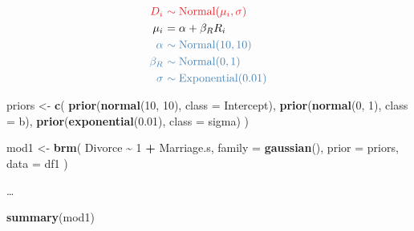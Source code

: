\documentclass[
  a4paper,11pt,twoside,onecolumn,openright,final,oldfontcommands]{memoir}
\newenvironment{Shaded}{\begin{snugshade}}{\end{snugshade}}
\newcommand{\DataTypeTok}[1]{\textcolor[rgb]{0.13,0.29,0.53}{#1}}
\newcommand{\DecValTok}[1]{\textcolor[rgb]{0.00,0.00,0.81}{#1}}
\newcommand{\FloatTok}[1]{\textcolor[rgb]{0.00,0.00,0.81}{#1}}
\newcommand{\KeywordTok}[1]{\textcolor[rgb]{0.13,0.29,0.53}{\textbf{#1}}}
\newcommand{\NormalTok}[1]{#1}
\newcommand{\OperatorTok}[1]{\textcolor[rgb]{0.81,0.36,0.00}{\textbf{#1}}}
\newcommand{\StringTok}[1]{\textcolor[rgb]{0.31,0.60,0.02}{#1}}
\theoremstyle{definition}
\theoremstyle{definition}
\theoremstyle{definition}
\theoremstyle{remark}
\begin{document}
\[
\begin{aligned}
\color{orangered}{D_{i}} \ &\color{orangered}{\sim \mathrm{Normal}(\mu_{i}, \sigma)} \\
\color{black}{\mu_{i}} \ &\color{black}{= \alpha + \beta_{R} R_{i}} \\
\color{steelblue}{\alpha} \ &\color{steelblue}{\sim \mathrm{Normal}(10, 10)} \\
\color{steelblue}{\beta_{R}} \ &\color{steelblue}{\sim \mathrm{Normal}(0, 1)} \\
\color{steelblue}{\sigma} \ &\color{steelblue}{\sim \mathrm{Exponential}(0.01)} \\
\end{aligned}
\]

\begin{Shaded}
\begin{Highlighting}[]
\NormalTok{priors \textless{}{-}}\StringTok{ }\KeywordTok{c}\NormalTok{(}
  \KeywordTok{prior}\NormalTok{(}\KeywordTok{normal}\NormalTok{(}\DecValTok{10}\NormalTok{, }\DecValTok{10}\NormalTok{), }\DataTypeTok{class =}\NormalTok{ Intercept),}
  \KeywordTok{prior}\NormalTok{(}\KeywordTok{normal}\NormalTok{(}\DecValTok{0}\NormalTok{, }\DecValTok{1}\NormalTok{), }\DataTypeTok{class =}\NormalTok{ b),}
  \KeywordTok{prior}\NormalTok{(}\KeywordTok{exponential}\NormalTok{(}\FloatTok{0.01}\NormalTok{), }\DataTypeTok{class =}\NormalTok{ sigma)}
\NormalTok{  )}

\NormalTok{mod1 \textless{}{-}}\StringTok{ }\KeywordTok{brm}\NormalTok{(}
\NormalTok{  Divorce }\OperatorTok{\textasciitilde{}}\StringTok{ }\DecValTok{1} \OperatorTok{+}\StringTok{ }\NormalTok{Marriage.s,}
  \DataTypeTok{family =} \KeywordTok{gaussian}\NormalTok{(),}
  \DataTypeTok{prior =}\NormalTok{ priors,}
  \DataTypeTok{data =}\NormalTok{ df1}
\NormalTok{  )}
\end{Highlighting}
\end{Shaded}

\ldots{}

\begin{Shaded}
\begin{Highlighting}[]
\KeywordTok{summary}\NormalTok{(mod1)}
\end{Highlighting}
\end{Shaded}
\end{document}
